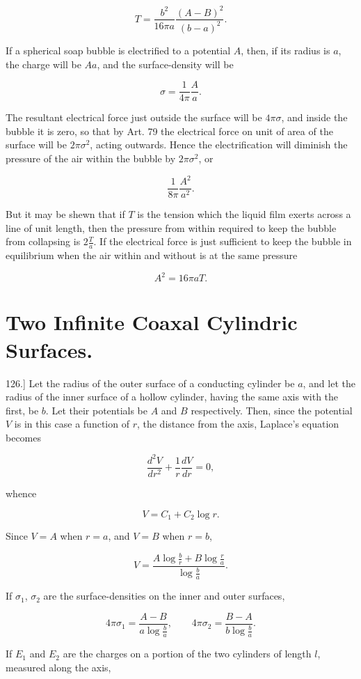 \documentclass[11pt,a4paper]{article}
\begin{document}
\[
T = \frac{b^2}{16\pi a} \frac{(A-B)^2}{(b-a)^2}.
\]

If a spherical soap bubble is electrified to a potential $A$, then, if its radius is $a$, the charge will be $Aa$, and the surface-density will be

\[
\sigma=\frac{1}{4\pi}\frac{A}{a}.
\]

The resultant electrical force just outside the surface will be $4\pi\sigma$, and inside the bubble it is zero, so that by Art. 79 the electrical force on unit of area of the surface will be $2\pi\sigma^2$, acting outwards. Hence the electrification will diminish the pressure of the air within the bubble by $2\pi\sigma^2$, or

\[
\frac{1}{8\pi}\frac{A^2}{a^2}.
\]

But it may be shewn that if $T$ is the tension which the liquid film exerts across a line of unit length, then the pressure from within required to keep the bubble from collapsing is $2\frac{T}{a}$. If the electrical force is just sufficient to keep the bubble in equilibrium when the air within and without is at the same pressure

\[
A^2=16\pi aT.
\]

\section*{Two Infinite Coaxal Cylindric Surfaces.}

126.] Let the radius of the outer surface of a conducting cylinder be $a$, and let the radius of the inner surface of a hollow cylinder, having the same axis with the first, be $b$. Let their potentials be $A$ and $B$ respectively. Then, since the potential $V$ is in this case a function of $r$, the distance from the axis, Laplace's equation becomes

\[
\frac{d^2V}{dr^2}+\frac{1}{r}\frac{dV}{dr}=0,
\]

whence

\[
V=C_1+C_2\log r.
\]

Since $V=A$ when $r=a$, and $V=B$ when $r=b$,

\[
V = \frac{A\log\frac{b}{r} + B\log\frac{r}{a}}{\log\frac{b}{a}}.
\]

If $\sigma_1$, $\sigma_2$ are the surface-densities on the inner and outer surfaces,

\[
4\pi\sigma_1 = \frac{A-B}{a\log\frac{b}{a}}, \qquad 4\pi\sigma_2 = \frac{B-A}{b\log\frac{b}{a}}.
\]

If $E_1$ and $E_2$ are the charges on a portion of the two cylinders of length $l$, measured along the axis,
\end{document}
